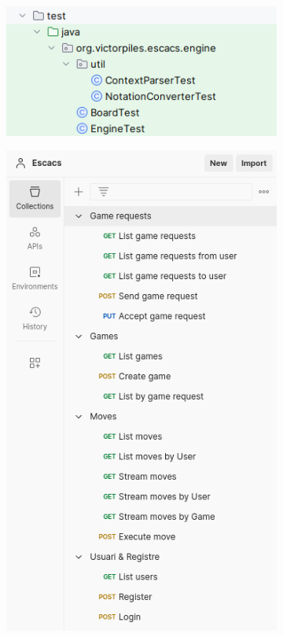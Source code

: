 \begin{figure}[H]
     \centering
     \begin{subfigure}[h]{0.5\textwidth}
         \centering
         \includegraphics[width=\textwidth]{images/junit.png}
         \label{fig:Login}
     \end{subfigure}
     \hspace{0.10\textwidth}
     \begin{subfigure}[h]{0.35\textwidth}
         \centering
         \includegraphics[width=\textwidth]{images/postman.png}

\end{subfigure}
\end{figure}
